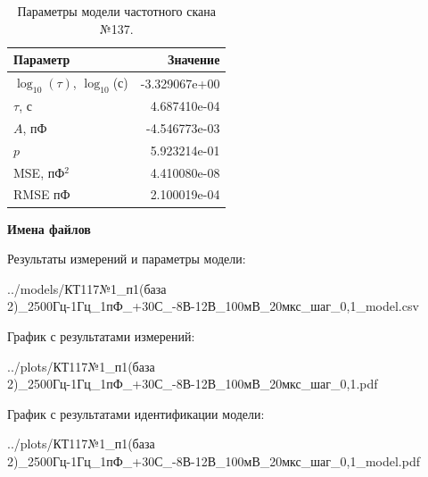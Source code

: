 \begin{table}[!ht]
    \centering
    \caption{Параметры модели частотного скана №137.}
    \begin{tabular}{|l|r|}
        \hline
        Параметр                                       & Значение                  \\ \hline
        $\log_{10}(\tau)$, $\log_{10}$(с)              & -3.329067e+00             \\ \hline
        $\tau$, с                                      & 4.687410e-04              \\ \hline
        $A$, пФ                                        & -4.546773e-03             \\ \hline
        $p$                                            & 5.923214e-01              \\ \hline
        MSE, пФ$^2$                                    & 4.410080e-08              \\ \hline
        RMSE пФ                                        & 2.100019e-04              \\ \hline
    \end{tabular}
    \label{table:frequency_scan_model_137}
\end{table}

\textbf{Имена файлов}

Результаты измерений и параметры модели:

\scriptsize../models/КТ117№1\_п1(база 2)\_2500Гц-1Гц\_1пФ\_+30С\_-8В-12В\_100мВ\_20мкс\_шаг\_0,1\_model.csv
\normalsize

График с результатами измерений:

\scriptsize../plots/КТ117№1\_п1(база 2)\_2500Гц-1Гц\_1пФ\_+30С\_-8В-12В\_100мВ\_20мкс\_шаг\_0,1.pdf
\normalsize

График с результатами идентификации модели:

\scriptsize../plots/КТ117№1\_п1(база 2)\_2500Гц-1Гц\_1пФ\_+30С\_-8В-12В\_100мВ\_20мкс\_шаг\_0,1\_model.pdf
\normalsize


